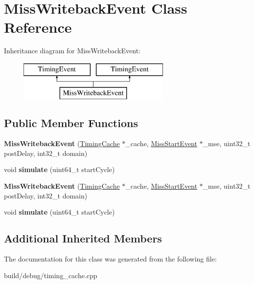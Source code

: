 \hypertarget{classMissWritebackEvent}{\section{Miss\-Writeback\-Event Class Reference}
\label{classMissWritebackEvent}
}
Inheritance diagram for Miss\-Writeback\-Event\-:\begin{figure}[H]
\begin{center}
\leavevmode
\includegraphics[height=2.000000cm]{classMissWritebackEvent}
\end{center}
\end{figure}
\subsection*{Public Member Functions}
\begin{DoxyCompactItemize}
\item 
\hypertarget{classMissWritebackEvent_a46dc94366945857eca7f8d3dbb8c05d3}{{\bfseries Miss\-Writeback\-Event} (\hyperlink{classTimingCache}{Timing\-Cache} $\ast$\-\_\-cache, \hyperlink{classMissStartEvent}{Miss\-Start\-Event} $\ast$\-\_\-mse, uint32\-\_\-t post\-Delay, int32\-\_\-t domain)}\label{classMissWritebackEvent_a46dc94366945857eca7f8d3dbb8c05d3}

\item 
\hypertarget{classMissWritebackEvent_a5741837d5b3af8641688057c4ac1651e}{void {\bfseries simulate} (uint64\-\_\-t start\-Cycle)}\label{classMissWritebackEvent_a5741837d5b3af8641688057c4ac1651e}

\item 
\hypertarget{classMissWritebackEvent_a46dc94366945857eca7f8d3dbb8c05d3}{{\bfseries Miss\-Writeback\-Event} (\hyperlink{classTimingCache}{Timing\-Cache} $\ast$\-\_\-cache, \hyperlink{classMissStartEvent}{Miss\-Start\-Event} $\ast$\-\_\-mse, uint32\-\_\-t post\-Delay, int32\-\_\-t domain)}\label{classMissWritebackEvent_a46dc94366945857eca7f8d3dbb8c05d3}

\item 
\hypertarget{classMissWritebackEvent_a5741837d5b3af8641688057c4ac1651e}{void {\bfseries simulate} (uint64\-\_\-t start\-Cycle)}\label{classMissWritebackEvent_a5741837d5b3af8641688057c4ac1651e}

\end{DoxyCompactItemize}
\subsection*{Additional Inherited Members}


The documentation for this class was generated from the following file\-:\begin{DoxyCompactItemize}
\item 
build/debug/timing\-\_\-cache.\-cpp\end{DoxyCompactItemize}
